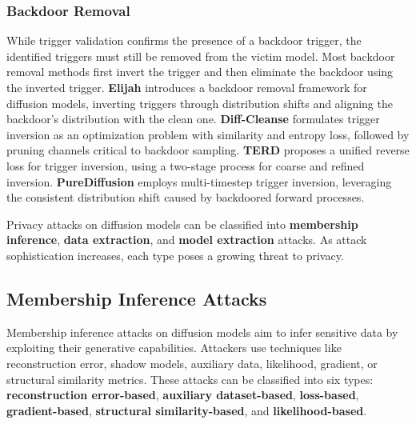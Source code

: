 \subsubsection{Backdoor Removal}
While trigger validation confirms the presence of a backdoor trigger, the identified triggers must still be removed from the victim model.
Most backdoor removal methods first invert the trigger and then eliminate the backdoor using the inverted trigger. 
\textbf{Elijah} \cite{an2024elijah} introduces a backdoor removal framework for diffusion models, inverting triggers through distribution shifts and aligning the backdoor's distribution with the clean one. \textbf{Diff-Cleanse} \cite{hao2024diff} formulates trigger inversion as an optimization problem with similarity and entropy loss, followed by pruning channels critical to backdoor sampling. \textbf{TERD} \cite{mo2024terd} proposes a unified reverse loss for trigger inversion, using a two-stage process for coarse and refined inversion. \textbf{PureDiffusion} \cite{truong2024purediffusion} employs multi-timestep trigger inversion, leveraging the consistent distribution shift caused by backdoored forward processes.





Privacy attacks on diffusion models can be classified into \textbf{membership inference}, \textbf{data extraction}, and \textbf{model extraction} attacks. As attack sophistication increases, each type poses a growing threat to privacy.


\subsection{Membership Inference Attacks}
\label{sec:dm_membership_inference_attacks}

Membership inference attacks on diffusion models aim to infer sensitive data by exploiting their generative capabilities. Attackers use techniques like reconstruction error, shadow models, auxiliary data, likelihood, gradient, or structural similarity metrics. These attacks can be classified into six types: \textbf{reconstruction error-based}, \textbf{auxiliary dataset-based}, \textbf{loss-based}, \textbf{gradient-based}, \textbf{structural similarity-based}, and \textbf{likelihood-based}.

